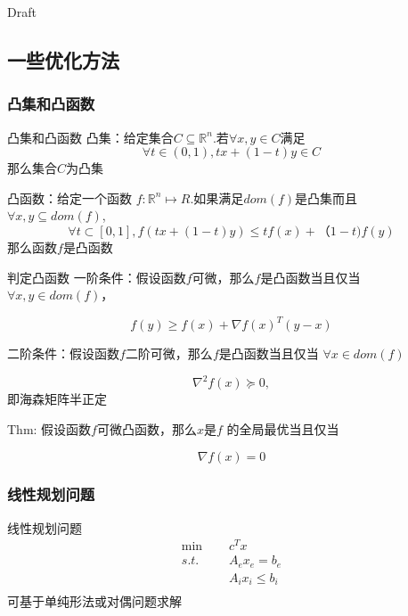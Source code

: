 \documentclass{ctexbeamer}
\begin{document}
\begin{frame}{Draft}

    
\end{frame}

\subsection{一些优化方法}
\subsubsection{凸集和凸函数}
 \begin{frame}{凸集和凸函数}
凸集：给定集合$C\subseteq \mathbb R^n$.若$\forall x,y\in C$满足
$$\forall t \in (0,1), tx + (1 - t)y \in C$$
那么集合$C$为凸集

凸函数：给定一个函数 $f:\mathbb R^n  \mapsto R$.如果满足$dom(f)$是凸集而且 $\forall x, y \subseteq dom(f)$, 
$$\forall t\subset  [0,1],  f(tx + (1-t)y)\leq tf(x)+（1-t)f(y)$$ 
那么函数$f$是凸函数

\end{frame}
 \begin{frame}{判定凸函数}
一阶条件：假设函数$f$可微，那么$f$是凸函数当且仅当 $\forall x,y \in dom(f)$，

$$f(y) \geq f(x)+\nabla f(x)^T (y -x)$$

二阶条件：假设函数$f$二阶可微，那么$f$是凸函数当且仅当 $\forall x \in dom(f)$

$$\nabla^2f(x)\succcurlyeq 0,$$
即海森矩阵半正定

Thm: 假设函数$f$可微凸函数，那么$x$是$f$ 的全局最优当且仅当

$$\nabla f(x) =0$$

\end{frame}

\subsubsection{线性规划问题}
\begin{frame}{线性规划问题}
\begin{equation*}
    \begin{split}
        \min\ \ \ \ \ \ & c^Tx\\
        s.t.\ \ \ \ \ \  & A_ex_e=b_e\\
        & A_ix_i\leq b_i\\
    \end{split}
\end{equation*}
可基于单纯形法或对偶问题求解

\end{frame}
\end{document}
